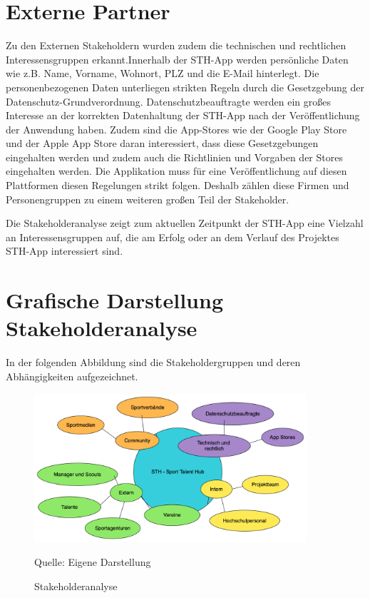 \section{Externe Partner}
Zu den Externen Stakeholdern wurden zudem die technischen und rechtlichen Interessensgruppen erkannt.Innerhalb der STH-App werden persönliche Daten wie z.B. Name, Vorname, Wohnort, PLZ und die E-Mail hinterlegt. Die personenbezogenen Daten unterliegen strikten Regeln durch die Gesetzgebung der Datenschutz-Grundverordnung.
Datenschutzbeauftragte werden ein großes Interesse an der korrekten Datenhaltung der STH-App nach der Veröffentlichung der Anwendung haben. Zudem sind die App-Stores wie der Google Play Store und der Apple App Store daran interessiert, dass diese Gesetzgebungen eingehalten werden und zudem auch die Richtlinien und Vorgaben der Stores eingehalten werden. Die Applikation muss für eine Veröffentlichung auf diesen Plattformen diesen Regelungen strikt folgen.
Deshalb zählen diese Firmen und Personengruppen zu einem weiteren großen Teil der Stakeholder.\newline

\noindent
Die Stakeholderanalyse zeigt zum aktuellen Zeitpunkt der STH-App eine Vielzahl an Interessensgruppen auf, die am Erfolg oder an dem Verlauf des Projektes STH-App interessiert sind.


\section{Grafische Darstellung Stakeholderanalyse}

In der folgenden Abbildung sind die Stakeholdergruppen und deren Abhängigkeiten aufgezeichnet.
\begin{figure}[H]
	\caption[Stakeholderanalyse]{Stakeholderanalyse}
	\centering
	\includegraphics[width=0.9\textwidth]{assets/figures/Stakeholderanalyse.png}
	\begin{flushleft}
		Quelle: Eigene Darstellung
	\end{flushleft}
\end{figure}


